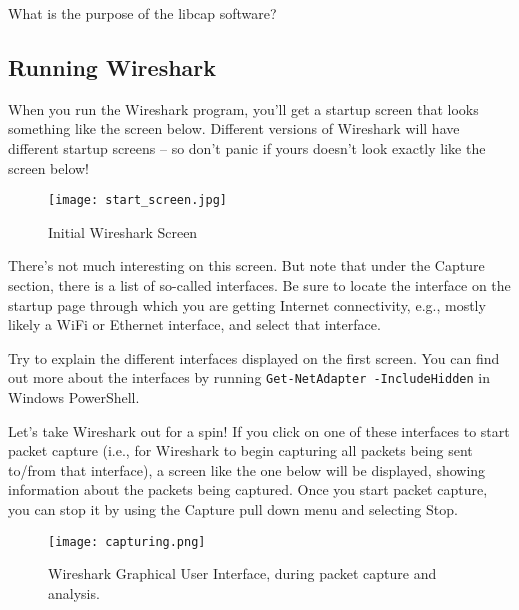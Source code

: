 \documentclass[11pt,a4paper]{article}
\begin{document}
\begin{question}
    What is the purpose of the libcap software?
\end{question}

\subsection{Running Wireshark}
When you run the Wireshark program, you'll get a startup screen that looks something
like the screen below. Different versions of Wireshark will have different startup screens
-- so don't panic if yours doesn't look exactly like the screen below!

\begin{figure}[h]
    \texttt{[image: start\_screen.jpg]}
    \caption{Initial Wireshark Screen}\label{fig:init-screen}
\end{figure}

There's not much interesting on this screen. But note that under the Capture section,
there is a list of so-called interfaces. Be sure to locate the interface on the startup page through which you are getting Internet
connectivity, e.g., mostly likely a WiFi or Ethernet interface, and select that interface.

\begin{question}
    Try to explain the different interfaces displayed on the first screen. You can find out more about the interfaces by running \texttt{Get-NetAdapter -IncludeHidden} in Windows PowerShell.
\end{question}

Let's take Wireshark out for a spin! If you click on one of these interfaces to start packet
capture (i.e., for Wireshark to begin capturing all packets being sent to/from that
interface), a screen like the one below will be displayed, showing information about the
packets being captured. Once you start packet capture, you can stop it by using the
Capture pull down menu and selecting Stop.

\begin{figure}[H]
    \texttt{[image: capturing.png]}
    \caption{Wireshark Graphical User Interface, during packet capture and analysis.}%
    \label{fig:packet_capt}
\end{figure}
\end{document}

